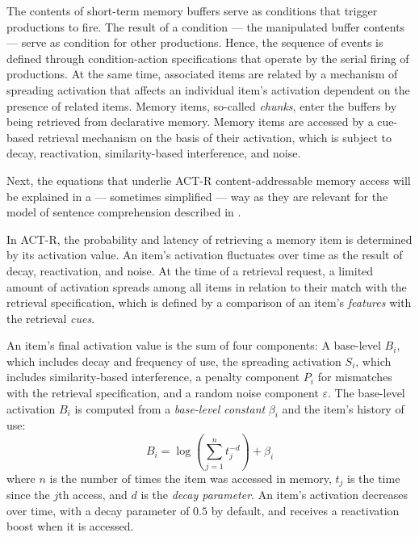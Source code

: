 \documentclass{cambridge7A}\usepackage[]{graphicx}\usepackage[]{color}
\begin{document}
The contents of short-term memory buffers serve as conditions that trigger productions to fire. The result of a condition --- the manipulated buffer contents --- serve as condition for other productions. Hence, the  sequence of events is defined through condition-action specifications that operate by the serial firing of productions. 
At the same time, associated items are related by a mechanism of spreading activation that affects an individual item's activation dependent on the presence of related items. Memory items, so-called \emph{chunks}, enter the buffers by being retrieved from declarative memory. 
Memory items are accessed by a cue-based retrieval mechanism on the basis of their activation, which is subject to decay, reactivation, similarity-based interference, and noise.

Next, the equations that underlie ACT-R content-addressable memory access will be explained in a --- sometimes simplified --- way as they are relevant for the model of sentence comprehension described in \cite{LewisVasishth2005}.

In ACT-R, the probability and latency of retrieving a memory item
is determined by its activation value. An item's activation fluctuates over time as the result of decay, reactivation, and noise. At the time of a retrieval request, a limited amount of activation spreads among all items in relation to their match with the retrieval specification, which is defined by a comparison of an item's \textit{features} with the retrieval \textit{cues}.

An item's final activation value is the sum of four components: A base-level $B_i$, which includes decay and frequency of use, the spreading activation $S_i$, which includes similarity-based interference, a penalty component $P_i$ for mismatches with the retrieval specification, and a random noise component $\varepsilon$.
The base-level activation $B_i$ is computed from a \textit{base-level constant} $\beta_i$ and the item's history of use:
\begin{equation}\label{eq:base}
	B_i = \log\left (\sum_{j=1}^n t_j^{-d}\right) + \beta_i
\end{equation}
where $n$ is the number of times the item was accessed in memory, $t_j$ is the time since the $j$th access, and $d$ is the \textit{decay parameter}. An item's activation decreases over time, with a decay parameter of $0.5$ by default, and receives a reactivation boost when it is accessed. 
\end{document}
